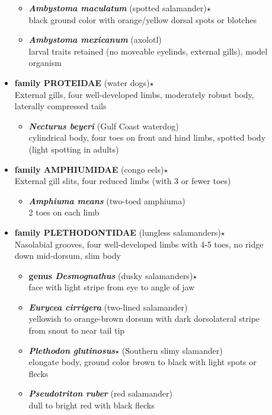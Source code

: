 \documentclass[a4paper,12pt]{article}
\begin{document}
\begin{description}
\begin{itemize}
\begin{itemize}
    \item{\textbf{\textit{Ambystoma maculatum}} (spotted salamander)$\star$} \\ black ground color with orange/yellow dorsal spots or blotches
    \item{\textbf{\textit{Ambystoma mexicanum}} (axolotl)} \\ larval traits retained (no moveable eyelinds, external gills), model organism
  \end{itemize}
  \item{\textbf{family PROTEIDAE} (water dogs)$\star$} \\ External gills, four well-developed limbs, moderately robust body, laterally compressed tails
  \begin{itemize}
    \item{\textbf{\textit{Necturus beyeri}} (Gulf Coast waterdog)} \\ cylindrical body, four toes on front and hind limbs, spotted body (light spotting in adults)
  \end{itemize}
  \item{\textbf{family AMPHIUMIDAE} (congo eels)$\star$} \\ External gill slits, four reduced limbs (with 3 or fewer toes)
  \begin{itemize}
    \item{\textbf{\textit{Amphiuma means}} (two-toed amphiuma)} \\ 2 toes on each limb
  \end{itemize}
  \item{\textbf{family PLETHODONTIDAE} (lungless salamanders)$\star$} \\ Nasolabial grooves, four well-developed limbs with 4-5 toes, no ridge down mid-dorsum, slim body
  \begin{itemize}
    \item{\textbf{genus\textit{ Desmognathus}} (dusky salamanders)$\star$} \\ face with light stripe from eye to angle of jaw
    \item{\textbf{\textit{Eurycea cirrigera}} (two-lined salamander)} \\ yellowish to orange-brown dorsum with dark dorsolateral stripe from snout to near tail tip
    \item{\textbf{\textit{Plethodon glutinosus}$\star$} (Southern slimy slamander)} \\ elongate body, ground color brown to black with light spots or flecks
    \item{\textbf{\textit{Pseudotriton ruber}} (red salamander)} \\ dull to bright red with black flecks
  \end{itemize}
\end{itemize}


\end{description}
\end{document}
